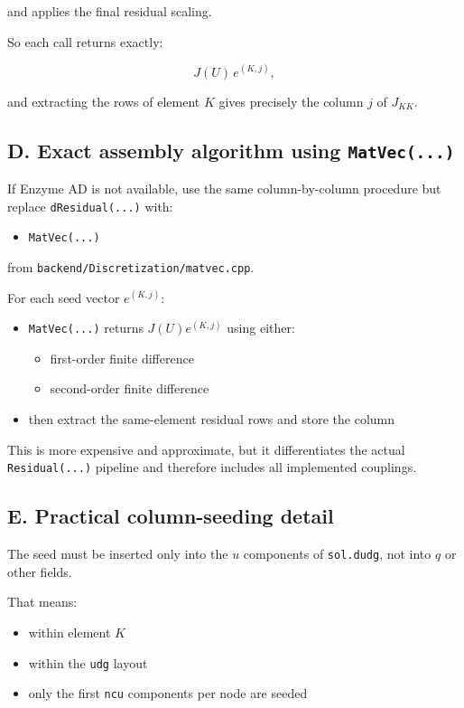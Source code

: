 \documentclass[11pt]{article}
\begin{document}
and applies the final residual scaling.

So each call returns exactly:

\[
J(U)\,e^{(K,j)},
\]

and extracting the rows of element $K$ gives precisely the column $j$ of
$J_{KK}$.

\subsection*{D. Exact assembly algorithm using \texttt{MatVec(...)}}

If Enzyme AD is not available, use the same column-by-column procedure but
replace \texttt{dResidual(...)} with:

\begin{itemize}[leftmargin=*]
\item \texttt{MatVec(...)}
\end{itemize}

from \texttt{backend/Discretization/matvec.cpp}.

For each seed vector $e^{(K,j)}$:

\begin{itemize}[leftmargin=*]
\item \texttt{MatVec(...)} returns $J(U)e^{(K,j)}$ using either:
\begin{itemize}[leftmargin=*]
\item first-order finite difference
\item second-order finite difference
\end{itemize}
\item then extract the same-element residual rows and store the column
\end{itemize}

This is more expensive and approximate, but it differentiates the actual
\texttt{Residual(...)} pipeline and therefore includes all implemented
couplings.

\subsection*{E. Practical column-seeding detail}

The seed must be inserted only into the $u$ components of \texttt{sol.dudg},
not into $q$ or other fields.

That means:

\begin{itemize}[leftmargin=*]
\item within element $K$
\item within the \texttt{udg} layout
\item only the first \texttt{ncu} components per node are seeded
\end{itemize}
\end{document}
